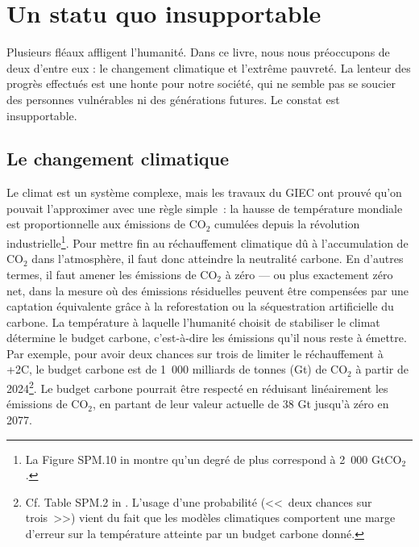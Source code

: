 \documentclass[a5paper,french]{memoir}
\begin{document}
\chapter{Un statu quo insupportable\label{ch:statu_quo}}

Plusieurs fléaux affligent l'humanité. Dans ce livre, nous nous préoccupons de deux d'entre eux : le changement climatique et l'extrême pauvreté. La lenteur des progrès effectués est une honte pour notre société, qui ne semble pas se soucier des personnes vulnérables ni des générations futures. Le constat est insupportable.

\section{Le changement climatique}

Le climat est un système complexe, mais les travaux du GIEC ont prouvé qu'on pouvait l'approximer avec une règle simple~: la hausse de température mondiale est proportionnelle aux émissions de CO$_\text{2}$ cumulées depuis la révolution industrielle\footnote{La Figure SPM.10 in \citet{ipcc_climate_2021} montre qu'un degré de plus correspond à 2~000 GtCO$_\text{2}$.}. Pour mettre fin au réchauffement climatique dû à l'accumulation de CO$_\text{2}$ dans l'atmosphère, il faut donc atteindre la neutralité carbone. En d'autres termes, il faut amener les émissions de CO$_\text{2}$ à zéro --- ou plus exactement zéro net, dans la mesure où des émissions résiduelles peuvent être compensées par une captation équivalente grâce à la reforestation ou la séquestration artificielle du carbone. La température à laquelle l'humanité choisit de stabiliser le climat détermine le budget carbone, c'est-à-dire les émissions qu'il nous reste à émettre. Par exemple, pour avoir deux chances sur trois de limiter le réchauffement à +2\textdegree{}C, le budget carbone est de 1~000 milliards de tonnes (Gt) de CO$_\text{2}$ à partir de 2024\footnote{Cf. Table SPM.2 in \citet{ipcc_climate_2021}. L'usage d'une probabilité (<<~deux chances sur trois~>>) vient du fait que les modèles climatiques comportent une marge d'erreur sur la température atteinte par un budget carbone donné.}. Le budget carbone pourrait être respecté en réduisant linéairement les émissions de CO$_\text{2}$, en partant de leur valeur actuelle de 38 Gt jusqu'à zéro en 2077. 
\end{document}
